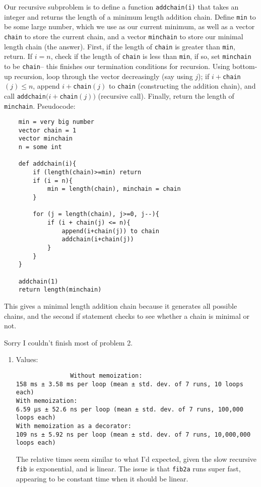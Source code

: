 \begin{solution}
    Our recursive subproblem is to define a function \texttt{addchain(i)} that takes an integer and returns the length of a minimum length addition chain. Define \texttt{min} to be some large number, which we use as our current minimum, as well as a vector \texttt{chain} to store the current chain, and a vector \texttt{minchain} to store our minimal length chain (the answer). First, if the length of \texttt{chain} is greater than \texttt{min}, return.  If $i=n$, check if the length of \texttt{chain} is less than \texttt{min}, if so, set \texttt{minchain} to be \texttt{chain}-- this finishes our termination conditions for recursion. Using bottom-up recursion, loop through the vector decreasingly (say using $j$); if $i+$\texttt{chain}$(j)\leq n$, append $i+$\texttt{chain}$(j)$ to \texttt{chain} (constructing the addition chain), and call \texttt{addchain}$(i+$\texttt{chain}$(j))$ (recursive call). Finally, return the length of \texttt{minchain}.
    Pseudocode:
    \begin{verbatim}
    min = very big number
    vector chain = 1
    vector minchain
    n = some int
     
    def addchain(i){
        if (length(chain)>=min) return
        if (i = n){
            min = length(chain), minchain = chain
        }       

        for (j = length(chain), j>=0, j--){
            if (i + chain(j) <= n){
                append(i+chain(j)) to chain
                addchain(i+chain(j))
            }
        } 
    } 

    addchain(1)
    return length(minchain)
    \end{verbatim}
    This gives a minimal length addition chain because it generates all possible chains, and the second if statement checks to see whether a chain is minimal or not.
\end{solution}

\begin{prob}
    
\end{prob}
\begin{solution}
    Sorry I couldn't finish most of problem 2. 
    \begin{enumerate}[label=(\alph*)]
    \setlength\itemsep{-.2em}
        \item Values:
            \begin{verbatim}
               Without memoization:
158 ms ± 3.58 ms per loop (mean ± std. dev. of 7 runs, 10 loops each)
With memoization:
6.59 µs ± 52.6 ns per loop (mean ± std. dev. of 7 runs, 100,000 loops each)
With memoization as a decorator:
109 ns ± 5.92 ns per loop (mean ± std. dev. of 7 runs, 10,000,000 loops each)
            \end{verbatim}The relative times seem similar to what I'd expected, given the slow recursive \texttt{fib} is exponential, and  is linear. The issue is that \texttt{fib2a} runs super fast, appearing to be constant time when it should be linear.\qedhere
    \end{enumerate}
\end{solution}

